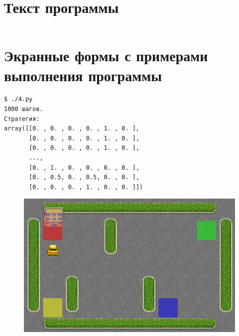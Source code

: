 \documentclass[a4paper]{article}
\begin{document}
  \section{Текст программы}
  \inputminted{python}{4.py}

  \section{Экранные формы с примерами выполнения программы}
  \begin{verbatim}
$ ./4.py
1000 шагов.
Стратегия:
array([[0. , 0. , 0. , 0. , 1. , 0. ],
       [0. , 0. , 0. , 0. , 1. , 0. ],
       [0. , 0. , 0. , 0. , 1. , 0. ],
       ...,
       [0. , 1. , 0. , 0. , 0. , 0. ],
       [0. , 0.5, 0. , 0.5, 0. , 0. ],
       [0. , 0. , 0. , 1. , 0. , 0. ]])
  \end{verbatim}
  \begin{figure}[H]
    \includegraphics[scale=0.5]{41}
  \end{figure}
\end{document}
